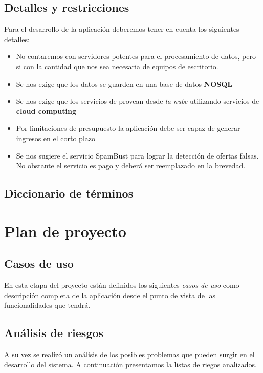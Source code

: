 \documentclass[10pt, a4paper]{article}
\begin{document}
\subsection{Detalles y restricciones}

Para el desarrollo de la aplicación deberemos tener en cuenta los siguientes detalles:

\begin{itemize}
\item No contaremos con servidores potentes para el procesamiento de datos, pero si con la cantidad que nos sea necesaria de equipos de escritorio.
\item Se nos exige que los datos se guarden en una base de datos \textbf{NOSQL}
\item Se nos exige que los servicios de provean desde \emph{la nube} utilizando servicios de \textbf{cloud computing}
\item Por limitaciones de presupuesto la aplicación debe ser capaz de generar ingresos en el corto plazo
\item Se nos sugiere el servicio SpamBust para lograr la detección de ofertas falsas. No obstante el servicio es pago y deberá ser reemplazado en la brevedad.
\end{itemize}

\subsection{Diccionario de términos}



\section{Plan de proyecto}

\subsection{Casos de uso}

En esta etapa del proyecto están definidos los siguientes \emph{casos de uso} como descripción completa de la aplicación desde el punto de vista de las funcionalidades que tendrá.



\subsection{Análisis de riesgos}

A su vez se realizó un análisis de los posibles problemas que pueden surgir en el desarrollo del sistema. A continuación presentamos la listas de riegos analizados.


\end{document}
